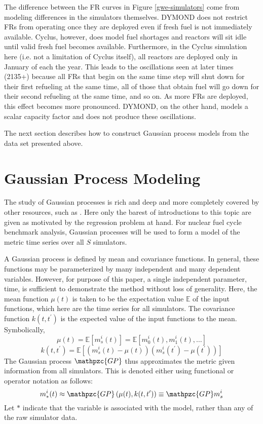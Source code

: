\documentclass{ntmanuscript}
\newcommand{\E}{\mathbb{E}}
\newcommand{\GP}{\mathpzc{GP}}
\begin{document}
The difference between the FR curves in Figure \ref{gwe-simulators} come
from modeling differences in the simulators themselves. DYMOND does not
restrict FRs from operating once they are deployed even if fresh fuel is not
immediately available. Cyclus, however, does model fuel shortages and
reactors will sit idle until valid fresh fuel becomes available. Furthermore,
in the Cyclus simulation here (i.e. not a limitation of Cyclus itself),
all reactors are deployed only in January of each the year.
This leads to the oscillations seen at later times (2135+) because all
FRs that begin on the same time step will shut down for their first
refueling at the same time, all of those that obtain fuel will go down for
their second refueling at the same time, and so on. As more FRs are deployed,
this effect becomes more pronounced. DYMOND, on the other hand, models a
scalar capacity factor and does not produce these oscillations.

The next section describes how to
construct Gaussian process models from the data set presented above.

\clearpage

\section{Gaussian Process Modeling}
\label{gp}
The study of Gaussian processes is rich and deep and more completely covered by
other resources, such as \cite{rasmussen2006gaussian}. Here only the barest of
introductions to this topic are given as motivated by the regression problem at
hand. For nuclear fuel cycle benchmark analysis, Gaussian processes will be used
to form a model of the metric time series over all $S$ simulators.

A Gaussian process is defined by mean and covariance functions.
In general, these functions may be parameterized by many independent and
many dependent variables.  However, for purpose of this paper, a single
independent parameter, time, is sufficient to demonstrate the method without
loss of generality.
Here, the mean function $\mu(t)$ is taken to be the expectation value $\E$ of
the input functions, which here are the time series for all simulators. The
covariance function $k(t, t^\prime)$ is the expected value of the input
functions to the mean. Symbolically,
\begin{equation}
\label{mean-func}
\mu(t) = \E\left[m_s^i(t)\right] = \E\left[m_0^i(t), m_1^i(t), \ldots\right]
\end{equation}
\begin{equation}
\label{covar-func}
k(t, t^\prime) = \E\left[(m_s^i(t) - \mu(t))(m_s^i(t^\prime) - \mu(t^\prime))\right]
\end{equation}
The Gaussian process $\GP$ thus approximates the metric given information
from all simulators. This is denoted either using functional or operator notation as follows:
\begin{equation}
\label{gp-def-approx}
m_*^i(t) \approx \GP\left(\mu(t), k(t, t^\prime)\right) \equiv \GP m_s^i
\end{equation}
Let $*$ indicate that the variable is associated with
the model, rather than any of the raw simulator data.
\end{document}
